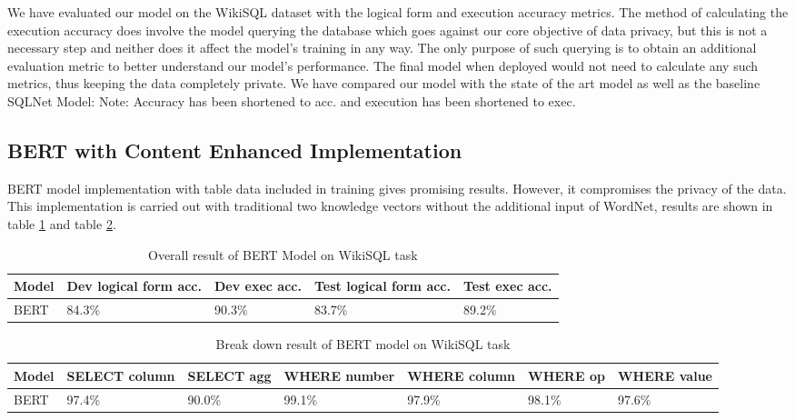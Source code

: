 \documentclass[12pt]{article}
\begin{document}
We have evaluated our model on the WikiSQL dataset with
the logical form and execution accuracy metrics. The method
of calculating the execution accuracy does involve the model
querying the database which goes against our core objective of
data privacy, but this is not a necessary step and neither does
it affect the model’s training in any way. The only purpose of
such querying is to obtain an additional evaluation metric to
better understand our model’s performance. The final model
when deployed would not need to calculate any such metrics,
thus keeping the data completely private.
We have compared our model with the state of the art model
as well as the baseline SQLNet Model:
Note: Accuracy has been shortened to acc. and execution
has been shortened to exec.

\subsection{BERT with Content Enhanced Implementation}

BERT model implementation with table data included in training gives promising results. However, it compromises the privacy of the data. This implementation is carried out with traditional two knowledge vectors without the additional input of WordNet, results are shown in table \ref{berttable} and table \ref{berttabledetailed}.


 \begin{table}
\centering
 \begin{tabular}{| m{2cm} | m{2cm}| m{2cm} |m{2cm}| m{2cm} |} 
 \hline
Model & Dev logical form acc. & Dev exec acc. & Test logical form acc. & Test exec acc. \\ 
 \hline\hline
  BERT & 84.3\% & 90.3\% & 83.7\% & 89.2\% \\ 
 \hline
\end{tabular}
\caption{Overall result of BERT Model on WikiSQL task}
\label{berttable}
\end{table}

\begin{table}
\centering
 \begin{tabular}{| m{2cm} | m{2cm}| m{2cm} |m{2cm}| m{2cm} |m{2cm} | m{2cm} |} 
 \hline
 Model  & SELECT column & SELECT agg & WHERE number & WHERE column & WHERE op & WHERE value\\ 
 \hline\hline
 BERT & 97.4\% & 90.0\% & 99.1\% & 97.9\% & 98.1\% &  97.6\% \\ 
 \hline

\end{tabular}
\caption{Break down result of BERT model on WikiSQL task}
\label{berttabledetailed}
\end{table}
\end{document}
